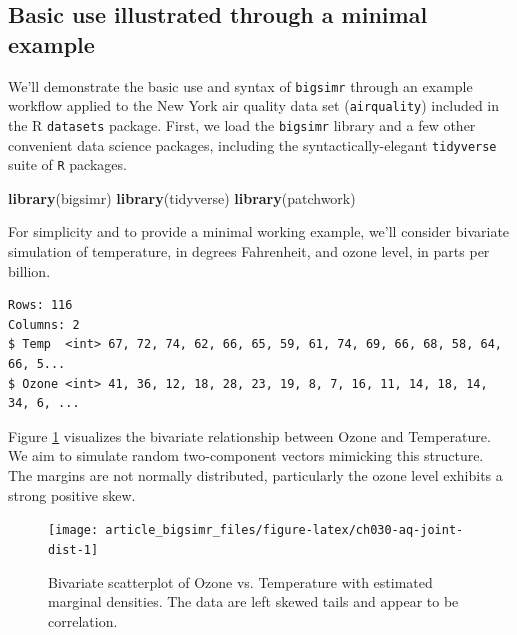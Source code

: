 \documentclass[]{article}
\newenvironment{Shaded}{\begin{snugshade}}{\end{snugshade}}
\newcommand{\KeywordTok}[1]{\textcolor[rgb]{0.13,0.29,0.53}{\textbf{#1}}}
\newcommand{\NormalTok}[1]{#1}
\newcommand{\OperatorTok}[1]{\textcolor[rgb]{0.81,0.36,0.00}{\textbf{#1}}}
\newcommand{\StringTok}[1]{\textcolor[rgb]{0.31,0.60,0.02}{#1}}
\begin{document}
\hypertarget{basic-use-illustrated-through-a-minimal-example}{%
\subsection{Basic use illustrated through a minimal example}\label{basic-use-illustrated-through-a-minimal-example}}

We'll demonstrate the basic use and syntax of \texttt{bigsimr} through an example workflow applied to the New York air quality data set (\texttt{airquality}) included in the R \texttt{datasets} package.
First, we load the \texttt{bigsimr} library and a few other convenient data science packages, including the syntactically-elegant \texttt{tidyverse} suite of \texttt{R} packages.

\begin{Shaded}
\begin{Highlighting}[]
\KeywordTok{library}\NormalTok{(bigsimr)}
\KeywordTok{library}\NormalTok{(tidyverse)}
\KeywordTok{library}\NormalTok{(patchwork)}
\end{Highlighting}
\end{Shaded}

For simplicity and to provide a minimal working example, we'll consider bivariate simulation of temperature, in degrees Fahrenheit, and ozone level, in parts per billion.

\begin{Shaded}
\end{Shaded}

\begin{verbatim}
Rows: 116
Columns: 2
$ Temp  <int> 67, 72, 74, 62, 66, 65, 59, 61, 74, 69, 66, 68, 58, 64, 66, 5...
$ Ozone <int> 41, 36, 12, 18, 28, 23, 19, 8, 7, 16, 11, 14, 18, 14, 34, 6, ...
\end{verbatim}

Figure \ref{fig:ch030-aq-joint-dist} visualizes the bivariate relationship between Ozone and Temperature.
We aim to simulate random two-component vectors mimicking this structure.
The margins are not normally distributed, particularly the ozone level exhibits a strong positive skew.

\begin{figure}

{\centering \texttt{[image: article\_bigsimr\_files/figure-latex/ch030-aq-joint-dist-1]} 

}

\caption{Bivariate scatterplot of Ozone vs. Temperature with estimated marginal densities. The data are left skewed tails and appear to be correlation.}\label{fig:ch030-aq-joint-dist}
\end{figure}
\end{document}
